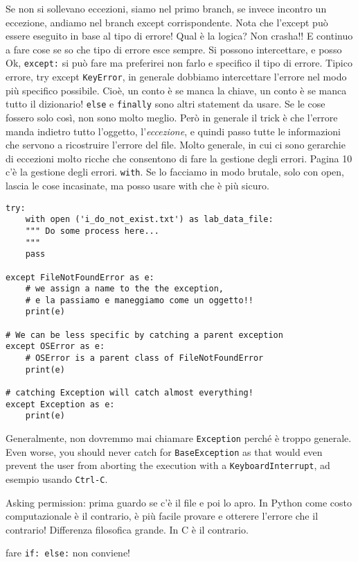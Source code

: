 \documentclass[10pt, a4paper, titlepage]{book}
\begin{document}
Se non si sollevano eccezioni, siamo nel primo branch, se invece incontro un eccezione, andiamo nel branch except corrispondente. 
Nota che l'except può essere eseguito in base al tipo di errore!
Qual è la logica? Non crasha!! E continuo a fare cose se so che tipo di errore esce sempre.
Si possono intercettare, e posso
Ok, \texttt{except:} si può fare ma preferirei non farlo e specifico il tipo di errore.
Tipico errore, try except \texttt{KeyError}, in generale dobbiamo intercettare l'errore nel modo più specifico possibile.
Cioè, un conto è se manca la chiave, un conto è se manca tutto il dizionario!
\texttt{else} e \texttt{finally} sono altri statement da usare.
Se le cose fossero solo così, non sono molto meglio. Però in generale il trick è che l'errore manda indietro tutto l'oggetto, l'\textit{eccezione}, e quindi passo tutte le informazioni che servono a ricostruire l'errore del file.
Molto generale, in cui ci sono gerarchie di eccezioni molto ricche che consentono di fare la gestione degli errori.
Pagina 10 c'è la gestione degli errori.
\texttt{with}. Se lo facciamo in modo brutale, solo con open, lascia le cose incasinate, ma posso usare with che è più sicuro.

\begin{verbatim}
try:
	with open ('i_do_not_exist.txt') as lab_data_file:
	""" Do some process here...
	"""
	pass

except FileNotFoundError as e: 
	# we assign a name to the the exception, 
	# e la passiamo e maneggiamo come un oggetto!!
	print(e)

# We can be less specific by catching a parent exception
except OSError as e:
	# OSError is a parent class of FileNotFoundError
	print(e)

# catching Exception will catch almost everything!
except Exception as e:
	print(e)
\end{verbatim}

Generalmente, non dovremmo mai chiamare \texttt{Exception} perché è troppo generale.
Even worse, you should never catch for \texttt{BaseException} 
as that would even prevent the user from aborting the execution with a \texttt{KeyboardInterrupt}, ad esempio usando \texttt{Ctrl-C}.

Asking permission: prima guardo se c'è il file e poi lo apro. In Python come costo computazionale è il contrario, è più facile provare e otterere l'errore che il contrario! Differenza filosofica grande. In C è il contrario.

fare \texttt{if: else:} non conviene!
\end{document}
